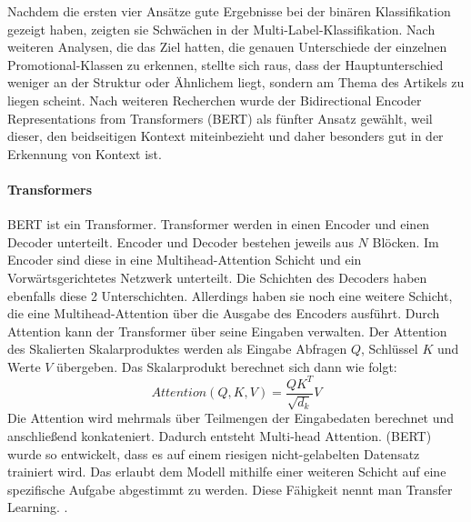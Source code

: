 Nachdem die ersten vier Ansätze gute Ergebnisse bei der binären Klassifikation gezeigt haben, zeigten sie Schwächen in der Multi-Label-Klassifikation. Nach weiteren Analysen, die das Ziel hatten, die genauen Unterschiede der einzelnen Promotional-Klassen zu erkennen, stellte sich raus, dass der Hauptunterschied weniger an der Struktur oder Ähnlichem liegt, sondern am Thema des Artikels zu liegen scheint. Nach weiteren Recherchen wurde der Bidirectional Encoder Representations from Transformers (BERT) als fünfter Ansatz gewählt, weil dieser, den beidseitigen Kontext miteinbezieht und daher besonders gut in der Erkennung von Kontext ist.
\paragraph{Transformers}
BERT ist ein Transformer. Transformer werden in einen Encoder und einen Decoder unterteilt. Encoder und Decoder bestehen jeweils aus $N$ Blöcken. Im Encoder sind diese in eine Multihead-Attention Schicht und ein Vorwärtsgerichtetes Netzwerk unterteilt. Die Schichten des Decoders haben ebenfalls diese 2 Unterschichten. Allerdings haben sie noch eine weitere Schicht, die eine Multihead-Attention über die Ausgabe des Encoders ausführt. Durch Attention kann der Transformer über seine Eingaben verwalten. Der Attention des Skalierten Skalarproduktes werden als Eingabe Abfragen $Q$, Schlüssel $K$ und Werte $V$ übergeben. Das Skalarprodukt berechnet sich dann wie folgt:
$${Attention(Q,K,V)} = {\frac{QK^T}{\sqrt{d_k}} V}$$
Die Attention wird mehrmals über Teilmengen der Eingabedaten berechnet und anschließend konkateniert. Dadurch entsteht Multi-head Attention. \cite{Vaswani2017}
(BERT) wurde so entwickelt, dass es auf einem riesigen nicht-gelabelten Datensatz trainiert wird. Das erlaubt dem Modell mithilfe einer weiteren Schicht auf eine spezifische Aufgabe abgestimmt zu werden. Diese Fähigkeit nennt man Transfer Learning. %
\cite{Devlin2018}.

